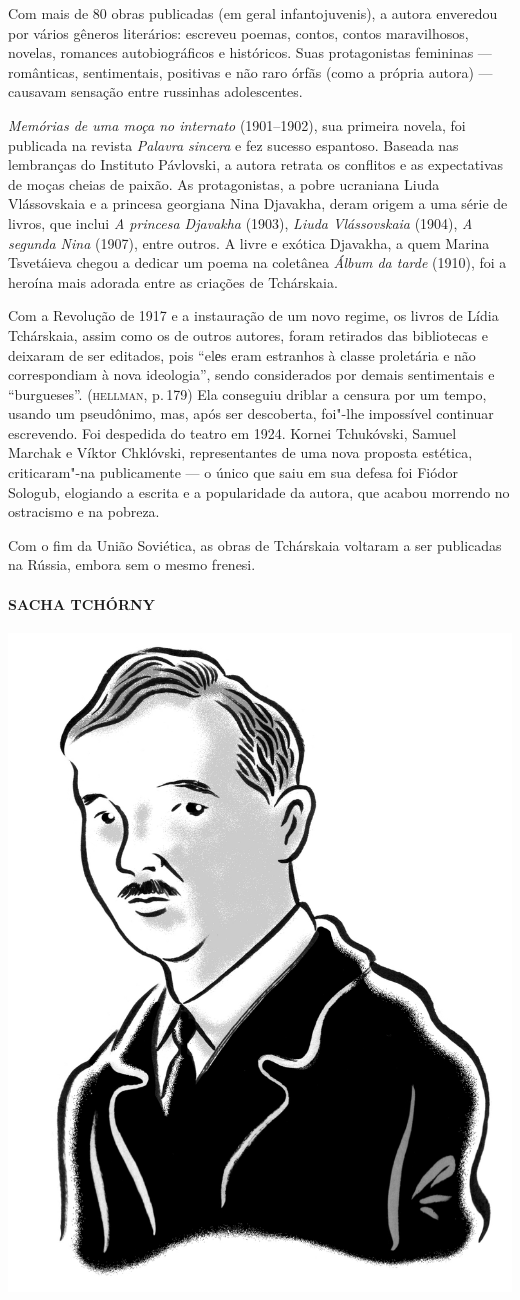 Com mais de 80 obras publicadas (em geral infantojuvenis), a autora
enveredou por vários gêneros literários: escreveu poemas, contos, contos
maravilhosos, novelas, romances autobiográficos e históricos. Suas
protagonistas femininas --- românticas, sentimentais, positivas e não
raro órfãs (como a própria autora) --- causavam sensação entre russinhas
adolescentes.

\emph{Memórias de uma moça no internato} (1901--1902), sua primeira
novela, foi publicada na revista \emph{Palavra sincera} e fez sucesso
espantoso. Baseada nas lembranças do Instituto Pávlovski, a autora
retrata os conflitos e as expectativas de moças cheias de paixão. As
protagonistas, a pobre ucraniana Liuda Vlássovskaia e a princesa
georgiana Nina Djavakha, deram origem a uma série de livros, que inclui
\emph{A princesa Djavakha} (1903), \emph{Liuda Vlássovskaia} (1904),
\emph{A segunda Nina} (1907), entre outros. A livre e exótica Djavakha,
a quem Marina Tsvetáieva chegou a dedicar um poema na coletânea
\emph{Álbum da tarde} (1910), foi a heroína mais adorada entre as
criações de Tchárskaia.

Com a Revolução de 1917 e a instauração de um novo regime, os livros de
Lídia Tchárskaia, assim como os de outros autores, foram retirados das
bibliotecas e deixaram de ser editados, pois ``elеs eram estranhos à
classe proletária e não correspondiam à nova ideologia'', sendo
considerados por demais sentimentais e ``burgueses''. (\textsc{hellman}, p.\,179)
Ela conseguiu driblar a censura por um tempo, usando um pseudônimo, mas,
após ser descoberta, foi"-lhe impossível continuar escrevendo. Foi
despedida do teatro em 1924. Kornei Tchukóvski, Samuel Marchak e Víktor
Chklóvski, representantes de uma nova proposta estética, criticaram"-na
publicamente --- o único que saiu em sua defesa foi Fiódor Sologub,
elogiando a escrita e a popularidade da autora, que acabou morrendo no
ostracismo e na pobreza.

Com o fim da União Soviética, as obras de Tchárskaia voltaram a ser
publicadas na Rússia, embora sem o mesmo frenesi.

\paragraph{SACHA TCHÓRNY}

\noindent\includegraphics[width=.8in]{./imgs/autor11.jpg}

